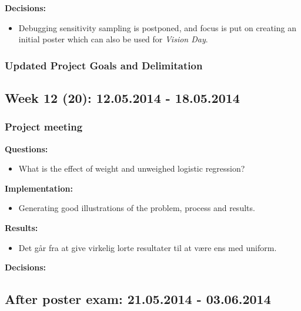 \textbf{Decisions:}\\
\begin{itemize}
\item Debugging sensitivity sampling is postponed, and focus is put on creating an initial poster which can also be used for \emph{Vision Day}.
\end{itemize}

\subsubsection*{Updated Project Goals and Delimitation}

\subsection*{Week 12 (20): 12.05.2014 - 18.05.2014}
\subsubsection*{Project meeting}
\textbf{Questions:}\\
\begin{itemize}
\item What is the effect of weight and unweighed logistic regression?
\end{itemize}

\textbf{Implementation:}\\
\begin{itemize}
\item Generating good illustrations of the problem, process and results.
\end{itemize}

\textbf{Results:}\\
\begin{itemize}
\item Det går fra at give virkelig lorte resultater til at være ens med uniform.
\end{itemize}

\textbf{Decisions:}\\


\subsection*{After poster exam: 21.05.2014 - 03.06.2014}
